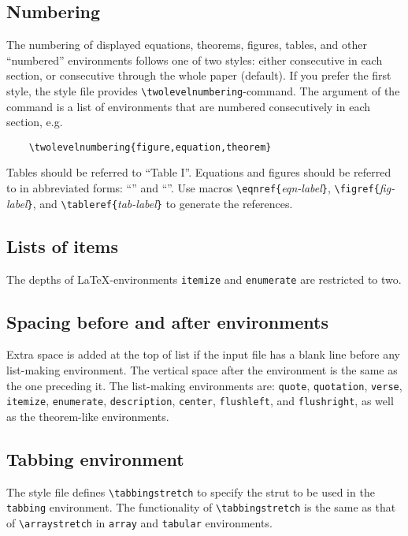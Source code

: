 \subsection{Numbering}
\label{numbering}

The numbering of displayed equations, theorems,
figures, tables, and other ``numbered'' environments
follows one of two styles:
either consecutive in each section,
or consecutive through the whole paper (default).
If you prefer the first style, the style file provides
\verb|\twolevelnumbering|-command.
The argument of the command is a list of environments that are
numbered consecutively in each section, e.g.
\begin{verbatim}
    \twolevelnumbering{figure,equation,theorem}
\end{verbatim}

Tables should be referred to ``Table I''.
Equations and figures should be referred to in abbreviated forms:
``'' and ``''.
Use macros \verb|\eqnref{|{\em eqn-label\/}\verb|}|,
\verb|\figref{|{\em fig-label\/}\verb|}|, and
\verb|\tableref{|{\em tab-label\/}\verb|}|
to generate the references.

\subsection{Lists of items}

The depths of \LaTeX-environments \verb|itemize| and \verb|enumerate|
are restricted to two.

\subsection{Spacing before and after environments}

Extra space is added at the top of list if the input file
has a blank line before any list-making environment.
The vertical space after the environment is the same as the
one preceding it.
The list-making environments are: {\tt quote}, {\tt quotation},
{\tt verse}, {\tt itemize}, {\tt enumerate}, {\tt description},
{\tt center}, {\tt flushleft}, and {\tt flushright},
as well as the theorem-like environments.

\subsection{Tabbing environment}

The style file defines \verb|\tabbingstretch| to specify the strut
to be used in the {\tt tabbing} environment. The functionality of
\verb|\tabbingstretch| is the same as that of \verb|\arraystretch|
in {\tt array} and {\tt tabular} environments.
